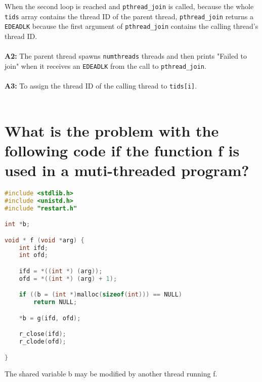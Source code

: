 \documentclass{article}
\begin{document}
When the second loop is reached and \texttt{pthread\_join} is called, because the whole \texttt{tids} array contains the thread ID of the parent thread, \texttt{pthread\_join} returns a \texttt{EDEADLK} because the first argument of \texttt{pthread\_join} contains the calling thread's thread ID. \\
\\
\textbf{A2:} The parent thread spawns \texttt{numthreads} threads and then prints "Failed to join" when it receives an \texttt{EDEADLK} from the call to \texttt{pthread\_join}. \\
\\
\textbf{A3:} To assign the thread ID of the calling thread to \texttt{tids[i]}. \\
\\
\section{What is the problem with the following code if the function f is used in a muti-threaded program?}
\begin{lstlisting}[language=C, basicstyle=\ttfamily\footnotesize, showstringspaces=false, stringstyle=\color{Salmon}, commentstyle=\itshape\color{magenta},  keywordstyle=\color{Bittersweet}]
#include <stdlib.h>
#include <unistd.h>
#include "restart.h"

int *b;

void * f (void *arg) {
	int ifd;
	int ofd;

	ifd = *((int *) (arg));
	ofd = *((int *) (arg) + 1);

	if ((b = (int *)malloc(sizeof(int))) == NULL)
		return NULL;

	*b = g(ifd, ofd);

	r_close(ifd);
	r_clode(ofd);

}
\end{lstlisting}
The shared variable b may be modified by another thread running f. \\
\\
\end{document}
